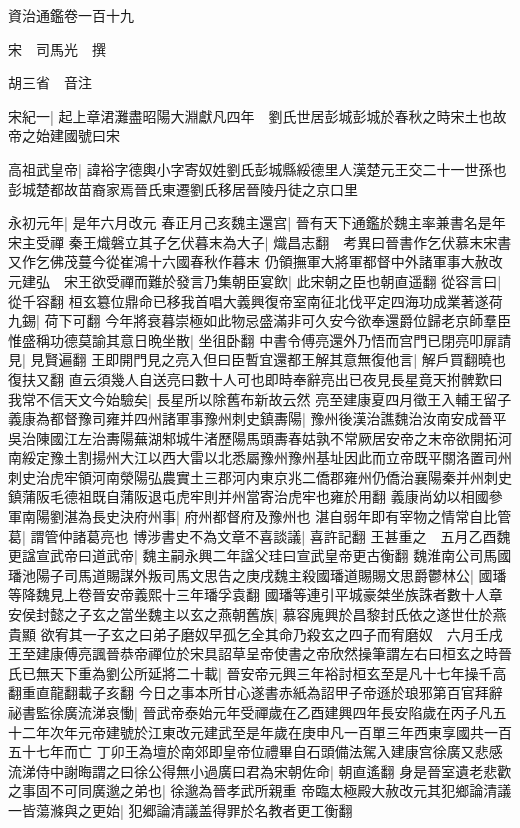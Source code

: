 資治通鑑卷一百十九

宋　司馬光　撰

胡三省　音注

宋紀一|{
	起上章涒灘盡昭陽大淵獻凡四年　劉氏世居彭城彭城於春秋之時宋土也故帝之始建國號曰宋}


高祖武皇帝|{
	諱裕字德輿小字寄奴姓劉氏彭城縣綏德里人漢楚元王交二十一世孫也彭城楚都故苗裔家焉晉氏東遷劉氏移居晉陵丹徒之京口里}


永初元年|{
	是年六月改元}
春正月己亥魏主還宫|{
	晉有天下通鑑於魏主率兼書名是年宋主受禪}
秦王熾磐立其子乞伏暮末為大子|{
	熾昌志翻　考異曰晉書作乞伏慕末宋書又作乞佛茂蔓今從崔鴻十六國春秋作暮末}
仍領撫軍大將軍都督中外諸軍事大赦改元建弘　宋王欲受禪而難於發言乃集朝臣宴飲|{
	此宋朝之臣也朝直遥翻}
從容言曰|{
	從千容翻}
桓玄簒位鼎命已移我首唱大義興復帝室南征北伐平定四海功成業著遂荷九錫|{
	荷下可翻}
今年將衰暮崇極如此物忌盛滿非可久安今欲奉還爵位歸老京師羣臣惟盛稱功德莫諭其意日晩坐散|{
	坐徂卧翻}
中書令傅亮還外乃悟而宫門已閉亮叩扉請見|{
	見賢遍翻}
王即開門見之亮入但曰臣暫宜還都王解其意無復他言|{
	解戶買翻曉也復扶又翻}
直云須幾人自送亮曰數十人可也即時奉辭亮出已夜見長星竟天拊髀歎曰我常不信天文今始驗矣|{
	長星所以除舊布新故云然}
亮至建康夏四月徵王入輔王留子義康為都督豫司雍并四州諸軍事豫州刺史鎮夀陽|{
	豫州後漢治譙魏治汝南安成晉平吳治陳國江左治夀陽蕪湖邾城牛渚歷陽馬頭夀春姑孰不常厥居安帝之末帝欲開拓河南綏定豫土割揚州大江以西大雷以北悉屬豫州豫州基址因此而立帝既平關洛置司州刺史治虎牢領河南滎陽弘農實土三郡河内東京兆二僑郡雍州仍僑治襄陽秦并州刺史鎮蒲阪毛德祖既自蒲阪退屯虎牢則并州當寄治虎牢也雍於用翻}
義康尚幼以相國參軍南陽劉湛為長史決府州事|{
	府州都督府及豫州也}
湛自弱年即有宰物之情常自比管葛|{
	謂管仲諸葛亮也}
博涉書史不為文章不喜談議|{
	喜許記翻}
王甚重之　五月乙酉魏更諡宣武帝曰道武帝|{
	魏主嗣永興二年諡父珪曰宣武皇帝更古衡翻}
魏淮南公司馬國璠池陽子司馬道賜謀外叛司馬文思告之庚戌魏主殺國璠道賜賜文思爵鬱林公|{
	國璠等降魏見上卷晉安帝義熙十三年璠孚袁翻}
國璠等連引平城豪桀坐族誅者數十人章安侯封懿之子玄之當坐魏主以玄之燕朝舊族|{
	慕容廆興於昌黎封氏依之遂世仕於燕貴顯}
欲宥其一子玄之曰弟子磨奴早孤乞全其命乃殺玄之四子而宥磨奴　六月壬戌王至建康傅亮諷晉恭帝禪位於宋具詔草呈帝使書之帝欣然操筆謂左右曰桓玄之時晉氏已無天下重為劉公所延將二十載|{
	晉安帝元興三年裕討桓玄至是凡十七年操千高翻重直龍翻載子亥翻}
今日之事本所甘心遂書赤紙為詔甲子帝遜於琅邪第百官拜辭祕書監徐廣流涕哀慟|{
	晉武帝泰始元年受禪歲在乙酉建興四年長安陷歲在丙子凡五十二年次年元帝建號於江東改元建武至是年歲在庚申凡一百單三年西東享國共一百五十七年而亡}
丁卯王為壇於南郊即皇帝位禮畢自石頭備法駕入建康宫徐廣又悲感流涕侍中謝晦謂之曰徐公得無小過廣曰君為宋朝佐命|{
	朝直遙翻}
身是晉室遺老悲歡之事固不可同廣邈之弟也|{
	徐邈為晉孝武所親重}
帝臨太極殿大赦改元其犯鄉論清議一皆蕩滌與之更始|{
	犯郷論清議盖得罪於名教者更工衡翻}


